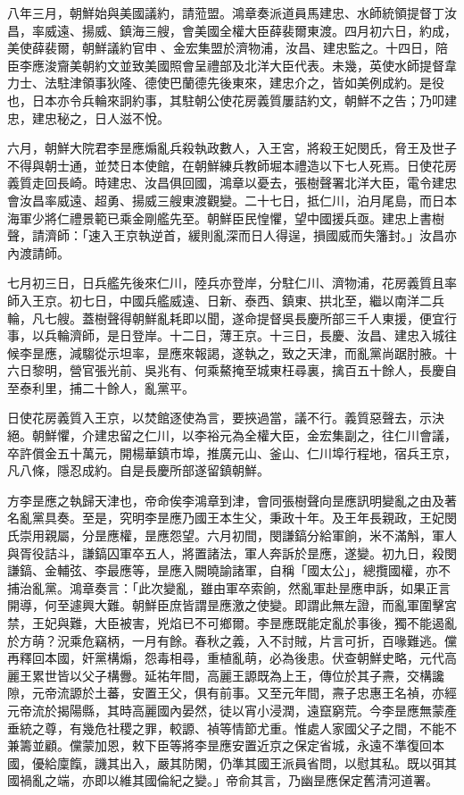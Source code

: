 \begin{pinyinscope}
八年三月，朝鮮始與美國議約，請蒞盟。鴻章奏派道員馬建忠、水師統領提督丁汝昌，率威遠、揚威、鎮海三艘，會美國全權大臣薛裴爾東渡。四月初六日，約成，美使薛裴爾，朝鮮議約官申、金宏集盟於濟物浦，汝昌、建忠監之。十四日，陪臣李應浚齎美朝約文並致美國照會呈禮部及北洋大臣代表。未幾，英使水師提督韋力士、法駐津領事狄隆、德使巴蘭德先後東來，建忠介之，皆如美例成約。是役也，日本亦令兵輪來詗約事，其駐朝公使花房義質屢詰約文，朝鮮不之告；乃叩建忠，建忠秘之，日人滋不悅。

六月，朝鮮大院君李昰應煽亂兵殺執政數人，入王宮，將殺王妃閔氏，脅王及世子不得與朝士通，並焚日本使館，在朝鮮練兵教師堀本禮造以下七人死焉。日使花房義質走回長崎。時建忠、汝昌俱回國，鴻章以憂去，張樹聲署北洋大臣，電令建忠會汝昌率威遠、超勇、揚威三艘東渡觀變。二十七日，抵仁川，泊月尾島，而日本海軍少將仁禮景範已乘金剛艦先至。朝鮮臣民惶懼，望中國援兵亟。建忠上書樹聲，請濟師：「速入王京執逆首，緩則亂深而日人得逞，損國威而失籓封。」汝昌亦內渡請師。

七月初三日，日兵艦先後來仁川，陸兵亦登岸，分駐仁川、濟物浦，花房義質且率師入王京。初七日，中國兵艦威遠、日新、泰西、鎮東、拱北至，繼以南洋二兵輪，凡七艘。蓋樹聲得朝鮮亂耗即以聞，遂命提督吳長慶所部三千人東援，便宜行事，以兵輪濟師，是日登岸。十二日，薄王京。十三日，長慶、汝昌、建忠入城往候李昰應，減騶從示坦率，昰應來報謁，遂執之，致之天津，而亂黨尚踞肘腋。十六日黎明，營官張光前、吳兆有、何乘鰲掩至城東枉尋裏，擒百五十餘人，長慶自至泰利里，捕二十餘人，亂黨平。

日使花房義質入王京，以焚館逐使為言，要挾過當，議不行。義質惡聲去，示決絕。朝鮮懼，介建忠留之仁川，以李裕元為全權大臣，金宏集副之，往仁川會議，卒許償金五十萬元，開楊華鎮市埠，推廣元山、釜山、仁川埠行程地，宿兵王京，凡八條，隱忍成約。自是長慶所部遂留鎮朝鮮。

方李昰應之執歸天津也，帝命俟李鴻章到津，會同張樹聲向昰應訊明變亂之由及著名亂黨具奏。至是，究明李昰應乃國王本生父，秉政十年。及王年長親政，王妃閔氏崇用親屬，分昰應權，昰應怨望。六月初間，閔謙鎬分給軍餉，米不滿斛，軍人與胥役詰斗，謙鎬囚軍卒五人，將置諸法，軍人奔訴於昰應，遂變。初九日，殺閔謙鎬、金輔弦、李最應等，昰應入闕曉諭諸軍，自稱「國太公」，總攬國權，亦不捕治亂黨。鴻章奏言：「此次變亂，雖由軍卒索餉，然亂軍赴昰應申訴，如果正言開導，何至遽興大難。朝鮮臣庶皆謂昰應激之使變。即謂此無左證，而亂軍圍擊宮禁，王妃與難，大臣被害，兇焰已不可鄉爾。李昰應既能定亂於事後，獨不能遏亂於方萌？況乘危竊柄，一月有餘。春秋之義，入不討賊，片言可折，百喙難逃。儻再釋回本國，奸黨構煽，怨毒相尋，重植亂萌，必為後患。伏查朝鮮史略，元代高麗王累世皆以父子構釁。延祐年間，高麗王謜既為上王，傳位於其子燾，交構讒隙，元帝流謜於土蕃，安置王父，俱有前事。又至元年間，燾子忠惠王名禎，亦經元帝流於揭陽縣，其時高麗國內晏然，徒以宵小浸潤，遠竄窮荒。今李昰應無蒙產垂統之尊，有幾危社稷之罪，較謜、禎等情節尤重。惟處人家國父子之間，不能不兼籌並顧。儻蒙加恩，敕下臣等將李昰應安置近京之保定省城，永遠不準復回本國，優給廩餼，譏其出入，嚴其防閑，仍準其國王派員省問，以慰其私。既以弭其國禍亂之端，亦即以維其國倫紀之變。」帝俞其言，乃幽昰應保定舊清河道署。


\end{pinyinscope}

